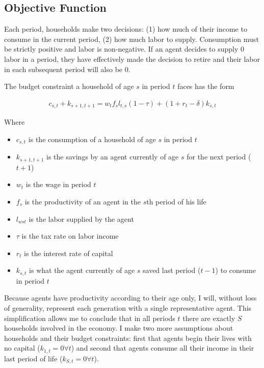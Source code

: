 \documentclass[paper=a4, fontsize=11pt]{scrartcl} %
\numberwithin{figure}{section} %
\numberwithin{table}{section} %
\begin{document}
	\subsection{Objective Function}

		Each period, households make two decisions: (1) how much of their income to consume in the current period, (2) how much labor to supply. Consumption must be strictly positive and labor is non-negative. If an agent decides to supply 0 labor in a period, they have effectively made the decision to retire and their labor in each subsequent period will also be 0.

		The budget constraint a household of age $s$ in period $t$ faces has the form

		\begin{align} \label{eq:budget}
			c_{s, t} + k_{s+1, t+1} = w_t f_s l_{t, s} (1 - \tau) + (1 + r_t - \delta) k_{s, t}
		\end{align}

		Where

		\begin{itemize}
			\item $c_{s, t}$ is the consumption of a household of age $s$ in period $t$
			\item $k_{s+1, t+1}$ is the savings by an agent currently of age $s$ for the next period ($t + 1$)
			\item $w_t$ is the wage in period $t$
			\item $f_s$ is the productivity of an agent in the $s$th period of his life
			\item $l_{ws t}$ is the labor supplied by the agent
			\item $\tau$ is the tax rate on labor income
			\item $r_t$ is the interest rate of capital
			\item $k_{s, t}$ is what the agent currently of age $s$ saved last period ($t-1$) to consume in period $t$
		\end{itemize}

		Because agents have productivity according to their age only, I will, without loss of generality, represent each generation with a single representative agent. This simplification allows me to conclude that in all periods $t$ there are exactly $S$ households involved in the economy. I make two more assumptions about households and their budget constraints: first that agents begin their lives with no capital ($k_{1, t} = 0 \forall t$) and second that agents consume all their income in their last period of life ($k_{S, t} = 0 \forall t$).
\end{document}

